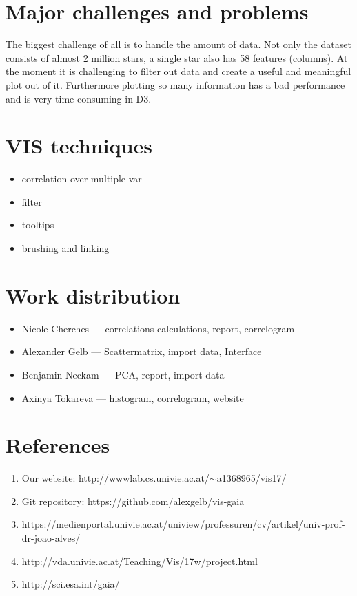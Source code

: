 \documentclass{article}
\begin{document}
\section{Major challenges and problems}
The biggest challenge of all is to handle the amount of data. Not only the dataset consists of almost 2 million stars, a single star also has 58 features (columns). At the moment it is challenging to filter out data and create a useful and meaningful plot out of it.  Furthermore plotting so many information has a bad performance and is very time consuming in D3.

\section {VIS techniques}
\begin{itemize}
\item correlation over multiple var
\item filter
\item tooltips
\item brushing and linking
\end{itemize}

\section {Work distribution}
\begin{itemize}
\item Nicole Cherches —  correlations calculations, report, correlogram
\item Alexander Gelb —  Scattermatrix, import data, Interface
\item Benjamin Neckam — PCA, report, import data
\item Axinya Tokareva — histogram, correlogram, website
\end{itemize}


\section {References}
\begin{enumerate}
\item Our website: http://wwwlab.cs.univie.ac.at/$\sim$a1368965/vis17/
\item Git repository: https://github.com/alexgelb/vis-gaia
\item https://medienportal.univie.ac.at/uniview/professuren/cv/artikel/univ-prof-dr-joao-alves/
\item http://vda.univie.ac.at/Teaching/Vis/17w/project.html
\item http://sci.esa.int/gaia/
\end{enumerate}
\end{document}
